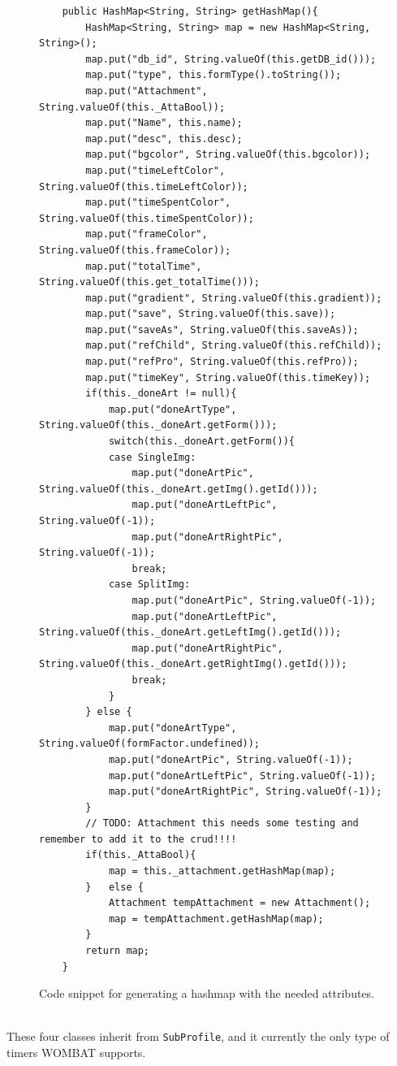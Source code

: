 \begin{description}
	\begin{figure}[H]
\begin{lstlisting}
	public HashMap<String, String> getHashMap(){
		HashMap<String, String> map = new HashMap<String, String>();
		map.put("db_id", String.valueOf(this.getDB_id()));
		map.put("type", this.formType().toString());		
		map.put("Attachment", String.valueOf(this._AttaBool));		
		map.put("Name", this.name);		
		map.put("desc", this.desc);		
		map.put("bgcolor", String.valueOf(this.bgcolor));		
		map.put("timeLeftColor", String.valueOf(this.timeLeftColor));		
		map.put("timeSpentColor", String.valueOf(this.timeSpentColor));		
		map.put("frameColor", String.valueOf(this.frameColor));
		map.put("totalTime", String.valueOf(this.get_totalTime()));		
		map.put("gradient", String.valueOf(this.gradient));		
		map.put("save", String.valueOf(this.save));		
		map.put("saveAs", String.valueOf(this.saveAs));
		map.put("refChild", String.valueOf(this.refChild));		
		map.put("refPro", String.valueOf(this.refPro));
		map.put("timeKey", String.valueOf(this.timeKey));
		if(this._doneArt != null){
			map.put("doneArtType", String.valueOf(this._doneArt.getForm()));
			switch(this._doneArt.getForm()){
			case SingleImg:
				map.put("doneArtPic", String.valueOf(this._doneArt.getImg().getId()));
				map.put("doneArtLeftPic", String.valueOf(-1));
				map.put("doneArtRightPic", String.valueOf(-1));
				break;
			case SplitImg:
				map.put("doneArtPic", String.valueOf(-1));
				map.put("doneArtLeftPic", String.valueOf(this._doneArt.getLeftImg().getId()));
				map.put("doneArtRightPic", String.valueOf(this._doneArt.getRightImg().getId()));
				break;
			}
		} else {
			map.put("doneArtType", String.valueOf(formFactor.undefined));
			map.put("doneArtPic", String.valueOf(-1));
			map.put("doneArtLeftPic", String.valueOf(-1));
			map.put("doneArtRightPic", String.valueOf(-1));
		}
		// TODO: Attachment this needs some testing and remember to add it to the crud!!!!
		if(this._AttaBool){
			map = this._attachment.getHashMap(map);				
		}	else {
			Attachment tempAttachment = new Attachment();
			map = tempAttachment.getHashMap(map);
		}
		return map;
	}
\end{lstlisting}
\caption{Code snippet for generating a hashmap with the needed attributes.}%
\label{code:subprofilehashmap}%
\end{figure}
	
	\item[TimeTimer - Hourglass - ProgressBar - DigitalClock] \hfill \\
  These four classes inherit from \texttt{SubProfile}, and it currently the only type of timers WOMBAT supports.
 

\end{description}
